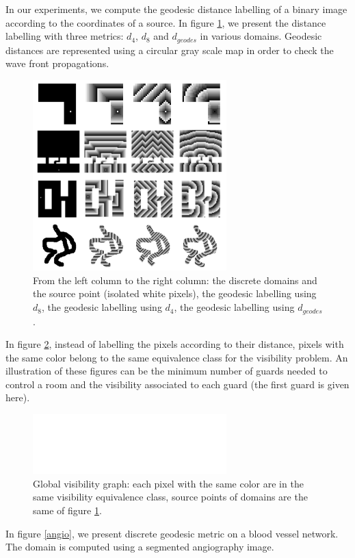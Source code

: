 \documentclass[fleqn,twoside]{article}
\begin{document}
In our experiments, we  compute the geodesic  distance labelling  of a
binary image  according to  the coordinates  of  a  source.  In figure
\ref{res1}, we present  the  distance  labelling with three   metrics:
$d_4$, $d_8$ and $d_{geodes}$  in various domains.  Geodesic distances
are represented using a circular gray scale map  in order to check the
wave front propagations. \begin{figure}[htb]
  \begin{center}
    \includegraphics[width=7.5cm]{result}
    \caption{From the left column to the right column: the discrete domains and the source point
      (isolated white pixels), the geodesic labelling using
    $d_8$, the geodesic labelling using $d_4$, the geodesic labelling using $d_{geodes}$.}
    \label{res1}
  \end{center}
\end{figure}
  In figure \ref{res2}, instead of labelling
the pixels  according to their  distance,  pixels with the same  color
belong to  the same equivalence class for   the visibility problem. An
illustration  of  these figures  can be  the minimum  number of guards
needed to control a  room and the visibility  associated to each guard
(the first guard is given here).
\begin{figure}[htb]
  \begin{center}
    \includegraphics[width=7.5cm]{result2}
    \caption{Global visibility graph: each pixel with the same color are in the same visibility
      equivalence class, source points of domains are the same of figure \ref{res1}.}
    \label{res2}
  \end{center}
\end{figure}
In figure \ref{angio}, we present discrete geodesic  metric on a blood
vessel network.  The domain is computed  using a segmented angiography
image.
\end{document}
